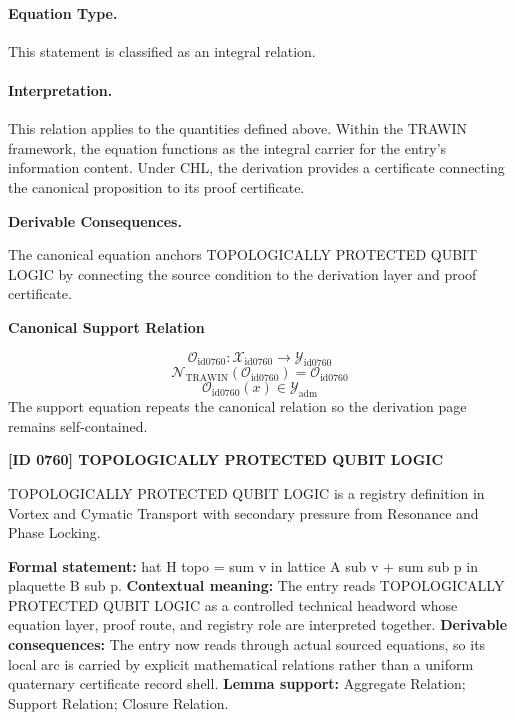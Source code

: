 \paragraph{Equation Type.}
This statement is classified as an integral relation.

\paragraph{Interpretation.}
This relation applies to the quantities defined above. Within the TRAWIN framework, the equation functions as the integral carrier for the entry’s information content. Under CHL, the derivation provides a certificate connecting the canonical proposition to its proof certificate.

\par\vspace{0.35em}
\noindent\textbf{Derivable Consequences.}\quad
\begingroup
\footnotesize
\raggedright
The canonical equation anchors TOPOLOGICALLY PROTECTED QUBIT LOGIC by connecting the source condition to the derivation layer and proof certificate.
\par\endgroup

\noindent\textbf{Canonical Support Relation}\par
\[
\mathcal{O}_{\mathrm{id0760}}:\mathcal{X}_{\mathrm{id0760}}\longrightarrow\mathcal{Y}_{\mathrm{id0760}}
\]
\[
\mathcal{N}_{\mathrm{TRAWIN}}(\mathcal{O}_{\mathrm{id0760}})=\mathcal{O}_{\mathrm{id0760}}
\]
\[
\mathcal{O}_{\mathrm{id0760}}(x)\in\mathcal{Y}_{\mathrm{adm}}
\]
\noindent The support equation repeats the canonical relation so the derivation page remains self-contained.\par

\clearpage
\noindent\textbf{[ID 0760] TOPOLOGICALLY PROTECTED QUBIT LOGIC}\par
\vspace{0.35em}
\begingroup\small
{}
TOPOLOGICALLY PROTECTED QUBIT LOGIC is a registry definition in Vortex and Cymatic Transport with secondary pressure from Resonance and Phase Locking.

\begingroup\footnotesize\setlength{\emergencystretch}{3em}\sloppy
\textbf{Formal statement:} hat H topo = sum v in lattice A sub v + sum sub p in plaquette B sub p. \textbf{Contextual meaning:} The entry reads TOPOLOGICALLY PROTECTED QUBIT LOGIC as a controlled technical headword whose equation layer, proof route, and registry role are interpreted together. \textbf{Derivable consequences:} The entry now reads through actual sourced equations, so its local arc is carried by explicit mathematical relations rather than a uniform quaternary certificate record shell. \textbf{Lemma support:} Aggregate Relation; Support Relation; Closure Relation.\par
\endgroup

